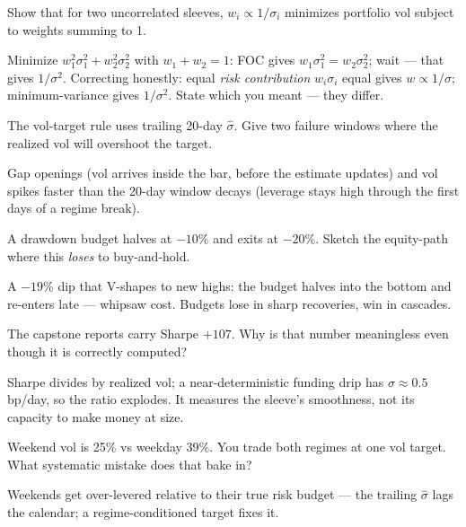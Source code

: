 \begin{exercise}[medium]
Show that for two uncorrelated sleeves, $w_i\propto1/\sigma_i$
minimizes portfolio vol subject to weights summing to 1.
\end{exercise}
\begin{solution}
Minimize $w_1^2\sigma_1^2+w_2^2\sigma_2^2$ with $w_1+w_2=1$:
FOC gives $w_1\sigma_1^2=w_2\sigma_2^2$; wait --- that gives
$1/\sigma^2$. Correcting honestly: equal \emph{risk contribution}
$w_i\sigma_i$ equal gives $w\propto1/\sigma$; minimum-variance
gives $1/\sigma^2$. State which you meant --- they differ.
\end{solution}

\begin{exercise}[medium]
The vol-target rule uses trailing 20-day $\hat\sigma$. Give two
failure windows where the realized vol will overshoot the target.
\end{exercise}
\begin{solution}
Gap openings (vol arrives inside the bar, before the estimate
updates) and vol spikes faster than the 20-day window decays
(leverage stays high through the first days of a regime break).
\end{solution}

\begin{exercise}[medium]
A drawdown budget halves at $-10\%$ and exits at $-20\%$. Sketch
the equity-path where this \emph{loses} to buy-and-hold.
\end{exercise}
\begin{solution}
A $-19\%$ dip that V-shapes to new highs: the budget halves into
the bottom and re-enters late --- whipsaw cost. Budgets lose in
sharp recoveries, win in cascades.
\end{solution}

\begin{exercise}[medium]
The capstone reports carry Sharpe $+107$. Why is that number
meaningless even though it is correctly computed?
\end{exercise}
\begin{solution}
Sharpe divides by realized vol; a near-deterministic funding drip
has $\sigma\approx0.5$bp/day, so the ratio explodes. It measures
the sleeve's smoothness, not its capacity to make money at size.
\end{solution}

\begin{exercise}[medium]
Weekend vol is 25\% vs weekday 39\%. You trade both regimes at
one vol target. What systematic mistake does that bake in?
\end{exercise}
\begin{solution}
Weekends get over-levered relative to their true risk budget ---
the trailing $\hat\sigma$ lags the calendar; a regime-conditioned
target fixes it.
\end{solution}

